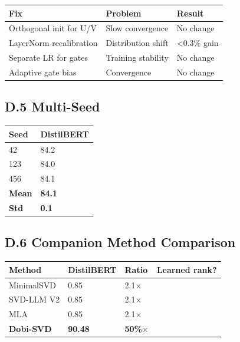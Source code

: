 \begin{table}[H]
\centering
\small
\begin{tabular}{lll}
\toprule
\textbf{Fix} & \textbf{Problem} & \textbf{Result} \\
\midrule
Orthogonal init for U/V & Slow convergence & No change \\
LayerNorm recalibration & Distribution shift & \textless{}0.3\% gain \\
Separate LR for gates & Training stability & No change \\
Adaptive gate bias & Convergence & No change \\
\bottomrule
\end{tabular}
\end{table}

\subsection{D.5 Multi-Seed}

\begin{table}[H]
\centering
\small
\begin{tabular}{ll}
\toprule
\textbf{Seed} & \textbf{DistilBERT} \\
\midrule
42 & 84.2 \\
123 & 84.0 \\
456 & 84.1 \\
\textbf{Mean} & \textbf{84.1} \\
\textbf{Std} & \textbf{0.1} \\
\bottomrule
\end{tabular}
\end{table}

\subsection{D.6 Companion Method Comparison}

\begin{table}[H]
\centering
\small
\begin{tabular}{llll}
\toprule
\textbf{Method} & \textbf{DistilBERT} & \textbf{Ratio} & \textbf{Learned rank?} \\
\midrule
MinimalSVD & 0.85 & 2.1$\times$ &  \\
SVD-LLM V2 & 0.85 & 2.1$\times$ &  \\
MLA & 0.85 & 2.1$\times$ &  \\
\textbf{Dobi-SVD} & \textbf{90.48} & \textbf{50\%$\times$} & \textbf{ } \\
\bottomrule
\end{tabular}
\end{table}

